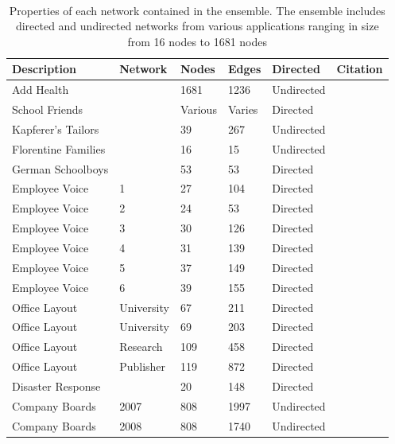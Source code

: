 \documentclass[
]{statsoc}
\begin{document}
\begin{table}
\caption{\label{tab:network_summaries} Properties of each network contained in the ensemble. The ensemble includes directed and undirected networks from various applications ranging in size from 16 nodes to 1681 nodes}\\
\begin{tabular}[t]{lllllr}
\toprule
Description & Network & Nodes & Edges & Directed  & Citation\\
\midrule
\rowcolor{gray!6}  Add Health &  & 1681 & 1236 & Undirected &  \cite{AddHealth2007}\\
\addlinespace
School Friends &  & Various & Varies & Directed &  \cite{Lubbers2007}\\
\rowcolor{gray!6}  Kapferer's Tailors &  & 39 & 267 & Undirected &  \cite{Robins2007}\\
\addlinespace
Florentine Families &  & 16 & 15 & Undirected &  \cite{Robins2007}\\
\rowcolor{gray!6}  German Schoolboys &  & 53 & 53 & Directed & \cite{Heidler2014}\\
\addlinespace
Employee Voice & 1 & 27 & 104 & Directed & \cite{Pauksktat2011}\\
\rowcolor{gray!6}  Employee Voice & 2 & 24 & 53 & Directed &  \cite{Pauksktat2011}\\
Employee Voice & 3 & 30 & 126 & Directed &  \cite{Pauksktat2011}\\
\rowcolor{gray!6}  Employee Voice & 4 & 31 & 139 & Directed &  \cite{Pauksktat2011}\\
Employee Voice & 5 & 37 & 149 & Directed &  \cite{Pauksktat2011}\\
\rowcolor{gray!6}  Employee Voice & 6 & 39 & 155 & Directed & \cite{Pauksktat2011}\\
\addlinespace
Office Layout & University & 67 & 211 & Directed & \cite{Sailer2012}\\
\rowcolor{gray!6}  Office Layout & University & 69 & 203 & Directed & \cite{Sailer2012}\\
Office Layout & Research & 109 & 458 & Directed & \cite{Sailer2012}\\
\rowcolor{gray!6}  Office Layout & Publisher & 119 & 872 & Directed & \cite{Sailer2012}\\
\addlinespace
Disaster Response &  & 20 & 148 & Directed & \cite{Doreian2012}\\
\addlinespace
\rowcolor{gray!6}  Company Boards & 2007 & 808 & 1997 & Undirected & \cite{Gygax2015}\\
Company Boards & 2008 & 808 & 1740 & Undirected & \cite{Gygax2015}\\

\end{tabular}
\end{table}
\end{document}
